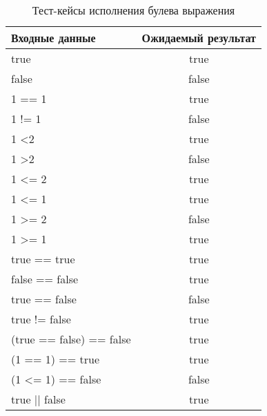\begin{table}[!ht]
    \Large
    \centering
    \begin{threeparttable}
        \caption{Тест-кейсы исполнения булева выражения}
        \label{t:testCases_boolExpr}
        \begin{tabularx}{\textwidth}{|X|c|}
            \hline
            Входные данные              & Ожидаемый результат \\
            \hline
            true                        & true                \\
            \hline
            false                       & false               \\
            \hline
            1 == 1                      & true                \\
            \hline
            1 != 1                      & false               \\
            \hline
            1 \textless 2               & true                \\
            \hline
            1 \textgreater 2            & false               \\
            \hline
            1 \textless{}= 2            & true                \\
            \hline
            1 \textless{}= 1            & true                \\
            \hline
            1 \textgreater{}= 2         & false               \\
            \hline
            1 \textgreater{}= 1         & true                \\
            \hline
            true == true                & true                \\
            \hline
            false == false              & true                \\
            \hline
            true == false               & false               \\
            \hline
            true != false               & true                \\
            \hline
            (true == false) == false    & true                \\
            \hline
            (1 == 1) == true            & true                \\
            \hline
            (1 \textless{}= 1) == false & false               \\
            \hline
            true || false               & true                \\

\end{tabularx}
\end{threeparttable}
\end{table}
